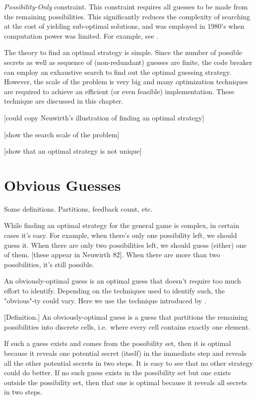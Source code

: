 \emph{Possibility-Only} constraint. This constraint requires all guesses to be made from the remaining possibilities. This significantly reduces the complexity of searching at the cost of yielding sub-optimal solutions, and was employed in 1980's when computation power was limited. For example, see \cite{neuwirth81}.

The theory to find an optimal strategy is simple. Since the number of possible secrets as well as sequence of (non-redundant) guesses are finite, the code breaker can employ an exhaustive search to find out the optimal guessing strategy. However, the scale of the problem is very big and many optimization techniques are required to achieve an efficient (or even feasible) implementation. These technique are discussed in this chapter.

[could copy Neuwirth's illustration of finding an optimal strategy]

[show the search scale of the problem]

[show that an optimal strategy is not unique]

\section{Obvious Guesses}

Some definitions. Partitions, feedback count, etc.


While finding an optimal strategy for the general game is complex, in certain cases it's easy. For example, when there's only one possibility left, we should guess it. When there are only two possibilities left, we should guess (either) one of them. [these appear in Neuwirth 82]. When there are more than two possibilities, it's still possible.

An obviously-optimal guess is an optimal guess that doesn't require too much effort to identify. Depending on the techniques used to identify such, the "obvious"-ty could vary. Here we use the technique introduced by \cite{koyama93}. 

[Definition.] An obviously-optimal guess is a guess that partitions the remaining possibilities into discrete cells, i.e.\ where every cell contains exactly one element. 

If such a guess exists and comes from the possibility set, then it is optimal because it reveals one potential secret (itself) in the immediate step and reveals all the other potential secrets in two steps. It is easy to see that no other strategy could do better. If no such guess exists in the possibility set but one exists outside the possibility set, then that one is optimal because it reveals all secrets in two steps. 

